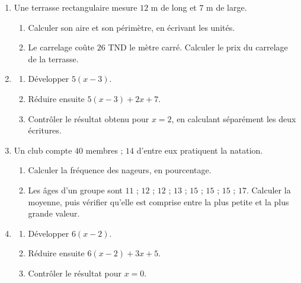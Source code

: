 \documentclass[10pt,a4paper]{article}
\begin{document}
\begin{enumerate}
\needspace{22mm}
\item[\textbf{B1.}] Une terrasse rectangulaire mesure $12$ m de long et $7$ m de large.
\begin{enumerate}
\item Calculer son aire et son périmètre, en écrivant les unités.
\item Le carrelage coûte $26$ TND le mètre carré. Calculer le prix du carrelage de la terrasse.
\end{enumerate}
\par\vspace{1.2mm}
\needspace{22mm}
\item[\textbf{B2.}] \begin{enumerate}
\item Développer $5(x - 3)$.
\item Réduire ensuite $5(x - 3) + 2x + 7$.
\item Contrôler le résultat obtenu pour $x = 2$, en calculant séparément les deux écritures.
\end{enumerate}
\par\vspace{1.2mm}
\needspace{22mm}
\item[\textbf{B3.}] Un club compte $40$ membres ; $14$ d'entre eux pratiquent la natation.
\begin{enumerate}
\item Calculer la fréquence des nageurs, en pourcentage.
\item Les âges d'un groupe sont $11$ ; $12$ ; $12$ ; $13$ ; $15$ ; $15$ ; $15$ ; $17$.
Calculer la moyenne, puis vérifier qu'elle est comprise entre la plus petite et la plus grande valeur.
\end{enumerate}
\par\vspace{1.2mm}
\needspace{22mm}
\item[\textbf{B4.}] \begin{enumerate}
\item Développer $6(x - 2)$.
\item Réduire ensuite $6(x - 2) + 3x + 5$.
\item Contrôler le résultat pour $x = 0$.
\end{enumerate}
\par\vspace{1.2mm}
\end{enumerate}
\needspace{68mm}\par\vspace{3mm}
\end{document}
